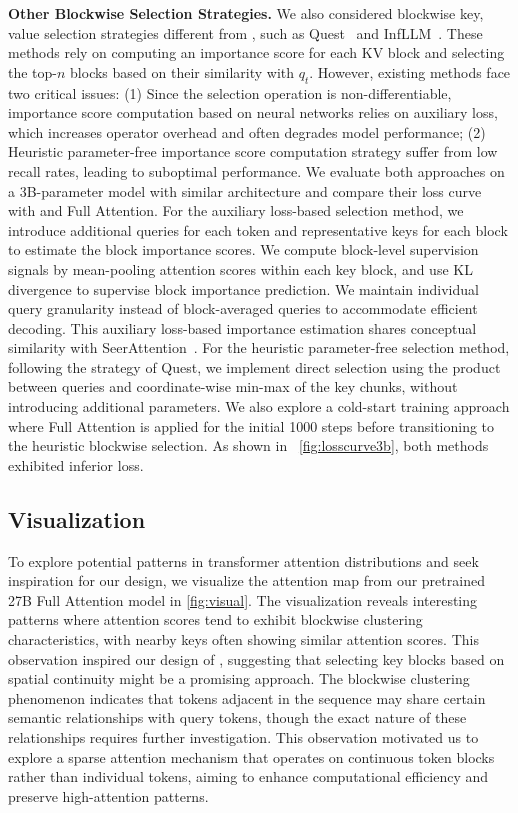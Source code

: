 \textbf{Other Blockwise Selection Strategies.}
We also considered blockwise key, value selection strategies different from \method{}, such as Quest~\citep{quest} and InfLLM~\citep{infllm}. These methods rely on
computing an importance score
for each KV block and selecting the top-$n$ blocks based on their similarity with $q_t$. However, existing methods face two critical issues: (1) Since the selection operation is non-differentiable, importance score computation based on neural networks relies on auxiliary loss, which increases operator overhead and often degrades model performance; (2) Heuristic parameter-free importance score computation strategy suffer from low recall rates, leading to suboptimal performance. We evaluate both approaches on a 3B-parameter model with similar architecture and compare their loss curve with \method{} and Full Attention.
For the auxiliary loss-based selection method, we introduce additional queries for each token and representative keys for each block to estimate the block importance scores.
We compute block-level supervision signals by mean-pooling attention scores within each key block, and use KL divergence to supervise block importance prediction. We maintain individual query granularity instead of block-averaged queries to accommodate efficient decoding. This auxiliary loss-based importance estimation shares conceptual similarity with SeerAttention~\citep{gao2024seerattention}.
For the heuristic parameter-free selection method, following the strategy of Quest, we implement direct selection using the product between queries and coordinate-wise min-max of the key chunks, without introducing additional parameters. We also explore a cold-start training approach where Full Attention is applied for the initial 1000 steps before transitioning to the heuristic blockwise selection.
As shown in ~\cref{fig:losscurve3b}, both methods exhibited inferior loss.

\vspace{-10pt}
\subsection{Visualization}
\label{appendix:vis}

To explore potential patterns in transformer attention distributions and seek inspiration for our design, we visualize the attention map from our pretrained 27B Full Attention model in \cref{fig:visual}. The visualization reveals interesting patterns where attention scores tend to exhibit blockwise clustering characteristics, with nearby keys often showing similar attention scores. This observation inspired our design of \method{}, suggesting that selecting key blocks based on spatial continuity might be a promising approach. The blockwise clustering phenomenon indicates that tokens adjacent in the sequence may share certain semantic relationships with query tokens, though the exact nature of these relationships requires further investigation. This observation motivated us to explore a sparse attention mechanism that operates on continuous token blocks rather than individual tokens, aiming to enhance computational efficiency and preserve high-attention patterns. 